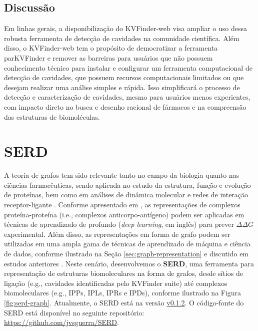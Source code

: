 \documentclass[Portugues]{phdquali}
\def\ie{i.e.\onedot}
\def\eg{e.g.\onedot}
\begin{document}
\subsection{Discussão}

Em linhas gerais, a disponibilização do KVFinder-web visa ampliar o uso dessa robusta ferramenta de detecção de cavidades na comunidade científica. Além disso, o KVFinder-web tem o propósito de democratizar a ferramenta parKVFinder e remover as barreiras para usuários que não possuem conhecimento técnico para instalar e configurar um ferramenta computacional de detecção de cavidades, que possuem recursos computacionais limitados ou que desejam realizar uma análise simples e rápida. Isso simplificará o processo de detecção e caracterização de cavidades, mesmo para usuários menos experientes, com impacto direto no busca e desenho racional de fármacos e na compreensão das estruturas de biomoléculas.

\section{SERD \label{sec:serd}}

A teoria de grafos tem sido relevante tanto no campo da biologia quanto nas ciências farmacêuticas, sendo aplicada no estudo da estrutura, função e evolução de proteínas, bem como em análises de dinâmica molecular e redes de interação receptor-ligante \cite{vishveshwara2002,mason2007,hummer2023}. Conforme apresentado em \cite{hummer2023}, as representações de complexos proteína-proteína (\ie, complexos anticorpo-antígeno) podem ser aplicadas em técnicas de aprendizado de profundo (\textit{deep learning}, em inglês) para prever $\Delta \Delta G$ experimental. Além disso, as representações em forma de grafo podem ser utilizadas em uma ampla gama de técnicas de aprendizado de máquina e ciência de dados, conforme ilustrado na Seção \ref{sec:graph-representation} e discutido em estudos anteriores \cite{majeed2020,vishveshwara2002,mason2007}. Neste cenário, desenvolvemos o \textbf{SERD}, uma ferramenta para representação de estruturas biomoleculares na forma de grafos, desde sítios de ligação (\eg, cavidades identificadas pelo KVFinder suite) até complexos biomoleculares (\eg, IPPs, IPLs, IPRs e IPDs), conforme ilustrado na Figura \ref{fig:serd-graph}. Atualmente, o SERD está na versão \href{https://github.com/jvsguerra/SERD/tree/v0.1.2}{v0.1.2}. O código-fonte do SERD está disponível no seguinte repositório: \url{https://github.com/jvsguerra/SERD}.
\end{document}

